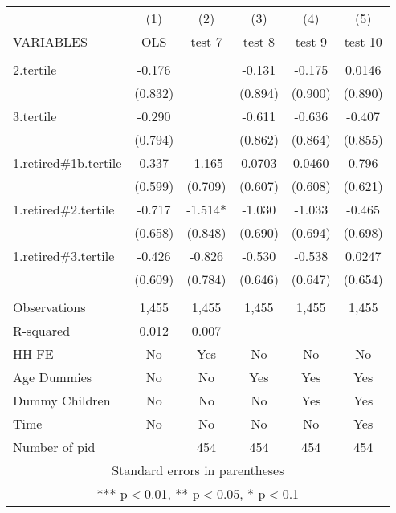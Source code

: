 \begin{tabular}{lccccc} \hline
 & (1) & (2) & (3) & (4) & (5) \\
VARIABLES & OLS & test 7 & test 8 & test 9 & test 10 \\ \hline
 &  &  &  &  &  \\
2.tertile & -0.176 &  & -0.131 & -0.175 & 0.0146 \\
 & (0.832) &  & (0.894) & (0.900) & (0.890) \\
3.tertile & -0.290 &  & -0.611 & -0.636 & -0.407 \\
 & (0.794) &  & (0.862) & (0.864) & (0.855) \\
1.retired\#1b.tertile & 0.337 & -1.165 & 0.0703 & 0.0460 & 0.796 \\
 & (0.599) & (0.709) & (0.607) & (0.608) & (0.621) \\
1.retired\#2.tertile & -0.717 & -1.514* & -1.030 & -1.033 & -0.465 \\
 & (0.658) & (0.848) & (0.690) & (0.694) & (0.698) \\
1.retired\#3.tertile & -0.426 & -0.826 & -0.530 & -0.538 & 0.0247 \\
 & (0.609) & (0.784) & (0.646) & (0.647) & (0.654) \\
 &  &  &  &  &  \\
Observations & 1,455 & 1,455 & 1,455 & 1,455 & 1,455 \\
R-squared & 0.012 & 0.007 &  &  &  \\
HH FE & No & Yes & No & No & No \\
Age Dummies & No & No & Yes & Yes & Yes \\
Dummy Children & No & No & No & Yes & Yes \\
Time & No & No & No & No & Yes \\
 Number of pid &  & 454 & 454 & 454 & 454 \\ \hline
\multicolumn{6}{c}{ Standard errors in parentheses} \\
\multicolumn{6}{c}{ *** p$<$0.01, ** p$<$0.05, * p$<$0.1} \\
\end{tabular}
